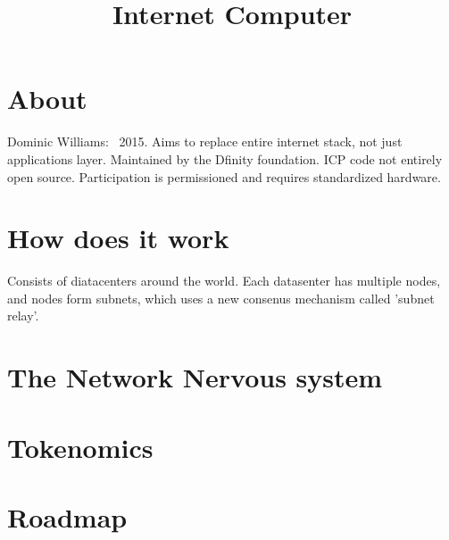 \documentclass{../notes}
\title{Internet Computer}
\begin{document}
\maketitle

\section{About}
Dominic Williams: ~2015. 
Aims to replace entire internet stack, not just applications layer. Maintained by the Dfinity foundation. ICP code not entirely open source. Participation is permissioned and requires standardized hardware. 


\section{How does it work}
Consists of diatacenters around the world. Each datasenter has multiple nodes, and nodes form subnets, which uses a new consenus mechanism called 'subnet relay'. 

\section{The Network Nervous system}

\section{Tokenomics}

\section{Roadmap}
\end{document}
